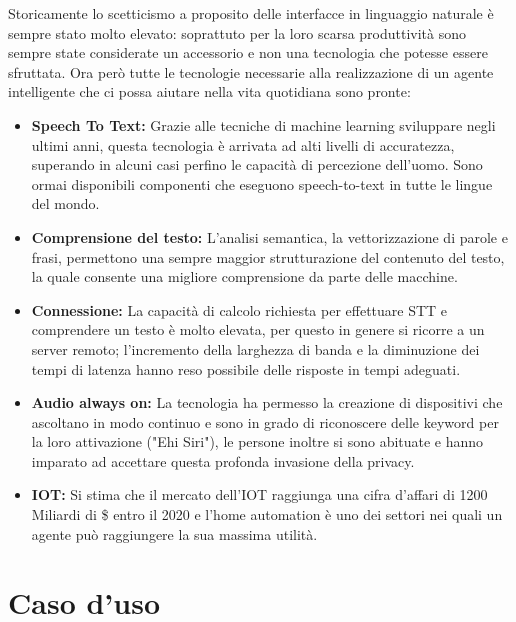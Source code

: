 \documentclass[twoside]{supsistudent}
\begin{document}
Storicamente lo scetticismo a proposito delle interfacce in linguaggio naturale è sempre stato molto elevato: soprattuto per la loro scarsa produttività sono sempre state considerate un accessorio e non una tecnologia che potesse essere sfruttata.
Ora però tutte le tecnologie necessarie alla realizzazione di un agente intelligente che ci possa aiutare nella vita quotidiana sono pronte:
\begin{itemize}
  \item \textbf{Speech To Text:} Grazie alle tecniche di machine learning sviluppare negli ultimi anni, questa tecnologia è arrivata ad alti livelli di accuratezza, superando in alcuni casi perfino le capacità di percezione dell'uomo. Sono ormai disponibili componenti che eseguono speech-to-text in tutte le lingue del mondo.\cite{sttmachinelearning}
  \item \textbf{Comprensione del testo:} L'analisi semantica, la vettorizzazione di parole e frasi, permettono una sempre maggior strutturazione del contenuto del testo, la quale consente una migliore comprensione da parte delle macchine.\cite{word2vec}
  \item \textbf{Connessione:} La capacità di calcolo richiesta per effettuare STT e comprendere un testo è molto elevata, per questo in genere si ricorre a un server remoto; l'incremento della larghezza di banda e la diminuzione dei tempi di latenza hanno reso possibile delle risposte in tempi adeguati.
  \item \textbf{Audio always on:} La tecnologia ha permesso la creazione di dispositivi che ascoltano in modo continuo e sono in grado di riconoscere delle keyword per la loro attivazione ("Ehi Siri"), le persone inoltre si sono abituate e hanno imparato ad accettare questa profonda invasione della privacy.
  \item \textbf{IOT:} Si stima che il mercato dell'IOT raggiunga una cifra d'affari di 1200 Miliardi di \$ entro il 2020 e l'home automation è uno dei settori nei quali un agente può raggiungere la sua massima utilità.
\end{itemize}

\chapter{Caso d'uso}
\end{document}
